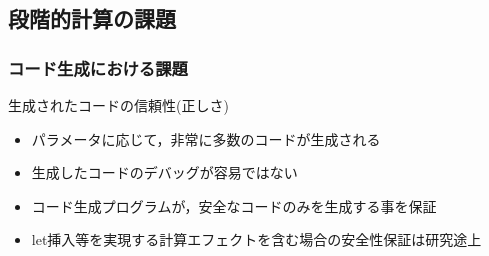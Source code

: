 \documentclass[dvipdfmx,cjk,xcolor=dvipsnames,envcountsect,notheorems,12pt]{beamer}
\theoremstyle{definition}
\begin{document}
\subsection{段階的計算の課題}

\begin{frame}
  \frametitle{コード生成における課題}
  生成されたコードの信頼性(正しさ)
  \begin{itemize}
  \item パラメータに応じて，非常に多数のコードが生成される
  \item 生成したコードのデバッグが容易ではない
  \end{itemize}

  \begin{itemize}
  \item<2-> コード生成プログラムが，安全なコードのみを生成する事を保証
  \item<2-> let挿入等を実現する\alert{計算エフェクトを含む場合の安全性保証は研究途上}
  \end{itemize}
\end{frame}
\end{document}
